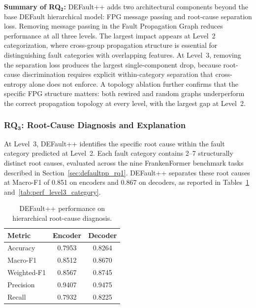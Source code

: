\FloatBarrier

\begin{rqsummary}
\textbf{Summary of RQ$\mathbf{_2}$:} DEFault++ adds two architectural components beyond the base DEFault hierarchical model: FPG message passing and root-cause separation loss. Removing message passing in the Fault Propagation Graph reduces performance at all three levels. The largest impact appears at Level~2 categorization, where cross-group propagation structure is essential for distinguishing fault categories with overlapping features. At Level~3, removing the separation loss produces the largest single-component drop, because root-cause discrimination requires explicit within-category separation that cross-entropy alone does not enforce. A topology ablation further confirms that the specific FPG structure matters: both rewired and random graphs underperform the correct propagation topology at every level, with the largest gap at Level~2.
\end{rqsummary}

\subsubsection{\textbf{RQ$\mathbf{_3}$:} Root-Cause Diagnosis and Explanation}
\label{sec:defaultpp_rq3}

At Level~3, DEFault++ identifies the specific root cause within the fault category predicted at Level~2. Each fault category contains 2--7 structurally distinct root causes, evaluated across the nine FrankenFormer benchmark tasks described in Section~\ref{sec:defaultpp_rq1}. DEFault++ separates these root causes at Macro-F1 of 0.851 on encoders and 0.867 on decoders, as reported in Tables~\ref{tab:perf_level3_overall} and~\ref{tab:perf_level3_category}.

\begin{table}[!htbp]
\centering
\caption{DEFault++ performance on hierarchical root-cause diagnosis.}
\label{tab:perf_level3_overall}
\begin{tabular}{l c c}
\toprule
\textbf{Metric} & \textbf{Encoder} & \textbf{Decoder} \\
\midrule
Accuracy & 0.7953 & 0.8264 \\
Macro-F1 & 0.8512 & 0.8670 \\
Weighted-F1 & 0.8567 & 0.8745 \\
Precision & 0.9407 & 0.9475 \\
Recall & 0.7932 & 0.8225 \\
\bottomrule
\end{tabular}
\end{table}

